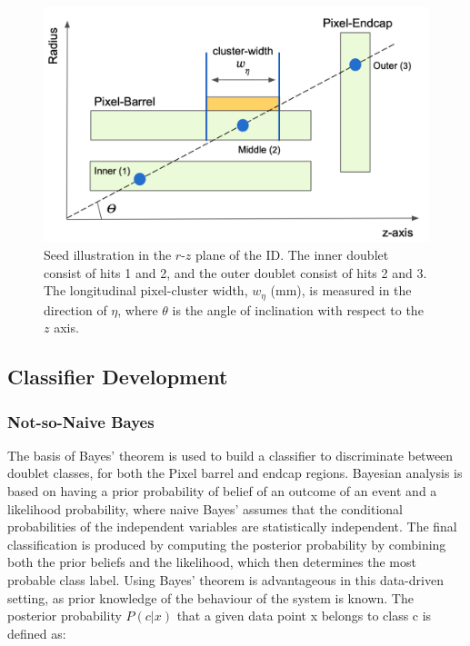 \begin{figure}[!htbp]
\centering
    \includegraphics[width=0.85\linewidth]{images/4-ml-based-predictor/triplet_illustration_2.png}
    \caption{Seed illustration in the $r$-$z$ plane of the ID. The inner doublet consist of hits 1 and 2, and the outer doublet consist of hits 2 and 3. The longitudinal pixel-cluster width, $w_{\eta}$ (mm), is measured in the direction of $\eta$, where $\theta$ is the angle of inclination with respect to the $z$ axis.}
\label{fig:triplet-illustration}
\end{figure}


\subsection{Classifier Development}
\label{section:classifier-dev}

\subsubsection{Not-so-Naive Bayes}

The basis of Bayes’ theorem \cite{naive-bayes} is used to build a classifier to discriminate between doublet classes, for both the Pixel barrel and endcap regions. Bayesian analysis is based on having a prior probability of belief of an outcome of an event and a likelihood probability, where naive Bayes’ assumes that the conditional probabilities of the independent variables are statistically independent. The final classification is produced by computing the posterior probability by combining both the prior beliefs and the likelihood, which then determines the most probable class label. Using Bayes’ theorem is advantageous in this data-driven setting, as prior knowledge of the behaviour of the system is known. The posterior probability $P(c|x)$ that a given data point x belongs to class c is defined as:

